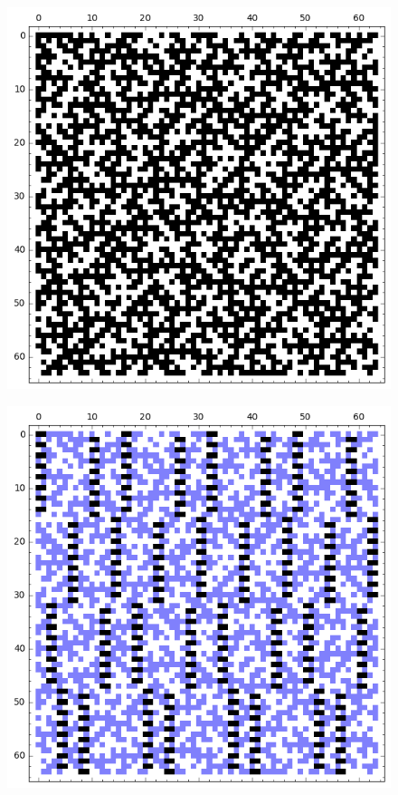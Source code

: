 \documentclass[12pt,a4paper]{article}
\begin{document}
\begin{figure}[!bhpt] %
\centering
\begin{minipage}{.48\textwidth}
  \centering
  \includegraphics[width=.9\linewidth]{../matrix_plot/re6_4_weight_class_matrix.png}
  \label{fig:6_4_weight_class_matrix}
\end{minipage}%
\begin{minipage}{.48\textwidth}
  \centering
  \includegraphics[width=.9\linewidth]{../matrix_plot/re6_4_bent_cayley_graph_index_matrix.png}
  \label{fig:6_4_bent_cayley_graph_index_matrix}
\end{minipage}
\end{figure}
\end{document}

